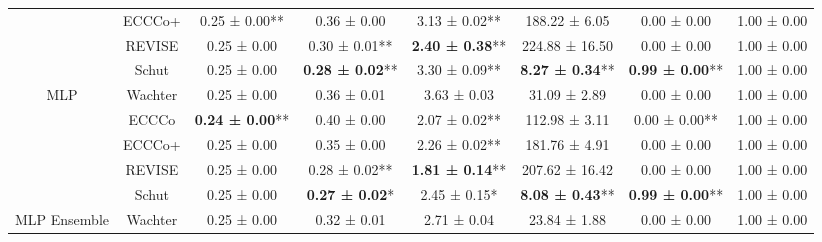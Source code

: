 \begin{table}
{\begin{tabular}[t]{cccccccc}
 & ECCCo+ & 0.25 ± 0.00** & 0.36 ± 0.00\hphantom{*}\hphantom{*} & 3.13 ± 0.02** & 188.22 ± 6.05\hphantom{*}\hphantom{*} & 0.00 ± 0.00\hphantom{*}\hphantom{*} & 1.00 ± 0.00\hphantom{*}\hphantom{*}\\

 & REVISE & 0.25 ± 0.00\hphantom{*}\hphantom{*} & 0.30 ± 0.01** & \textbf{2.40 ± 0.38}** & 224.88 ± 16.50\hphantom{*}\hphantom{*} & 0.00 ± 0.00\hphantom{*}\hphantom{*} & 1.00 ± 0.00\hphantom{*}\hphantom{*}\\

 & Schut & 0.25 ± 0.00\hphantom{*}\hphantom{*} & \textbf{0.28 ± 0.02}** & 3.30 ± 0.09** & \textbf{8.27 ± 0.34}** & \textbf{0.99 ± 0.00}** & 1.00 ± 0.00\hphantom{*}\hphantom{*}\\

\multirow[t]{-5}{*}{\centering\arraybackslash MLP} & Wachter & 0.25 ± 0.00\hphantom{*}\hphantom{*} & 0.36 ± 0.01\hphantom{*}\hphantom{*} & 3.63 ± 0.03\hphantom{*}\hphantom{*} & 31.09 ± 2.89\hphantom{*}\hphantom{*} & 0.00 ± 0.00\hphantom{*}\hphantom{*} & 1.00 ± 0.00\hphantom{*}\hphantom{*}\\
\cmidrule{1-8}
 & ECCCo & \textbf{0.24 ± 0.00}** & 0.40 ± 0.00\hphantom{*}\hphantom{*} & 2.07 ± 0.02** & 112.98 ± 3.11\hphantom{*}\hphantom{*} & 0.00 ± 0.00** & 1.00 ± 0.00\hphantom{*}\hphantom{*}\\

 & ECCCo+ & 0.25 ± 0.00\hphantom{*}\hphantom{*} & 0.35 ± 0.00\hphantom{*}\hphantom{*} & 2.26 ± 0.02** & 181.76 ± 4.91\hphantom{*}\hphantom{*} & 0.00 ± 0.00\hphantom{*}\hphantom{*} & 1.00 ± 0.00\hphantom{*}\hphantom{*}\\

 & REVISE & 0.25 ± 0.00\hphantom{*}\hphantom{*} & 0.28 ± 0.02** & \textbf{1.81 ± 0.14}** & 207.62 ± 16.42\hphantom{*}\hphantom{*} & 0.00 ± 0.00\hphantom{*}\hphantom{*} & 1.00 ± 0.00\hphantom{*}\hphantom{*}\\

 & Schut & 0.25 ± 0.00\hphantom{*}\hphantom{*} & \textbf{0.27 ± 0.02}*\hphantom{*} & 2.45 ± 0.15*\hphantom{*} & \textbf{8.08 ± 0.43}** & \textbf{0.99 ± 0.00}** & 1.00 ± 0.00\hphantom{*}\hphantom{*}\\

\multirow[t]{-5}{*}{\centering\arraybackslash MLP Ensemble} & Wachter & 0.25 ± 0.00\hphantom{*}\hphantom{*} & 0.32 ± 0.01\hphantom{*}\hphantom{*} & 2.71 ± 0.04\hphantom{*}\hphantom{*} & 23.84 ± 1.88\hphantom{*}\hphantom{*} & 0.00 ± 0.00\hphantom{*}\hphantom{*} & 1.00 ± 0.00\hphantom{*}\hphantom{*}\\
\bottomrule
\end{tabular}}
\end{table}
